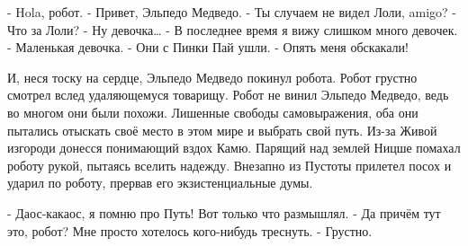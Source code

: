 - Hola, робот.
- Привет, Эльпедо Медведо.
- Ты случаем не видел Лоли, amigo?
- Что за Лоли?
- Ну девочка…
- В последнее время я вижу слишком много девочек.
- Маленькая девочка.
- Они с Пинки Пай ушли.
- Опять меня обскакали!

И, неся тоску на сердце, Эльпедо Медведо покинул робота. Робот грустно смотрел вслед удаляющемуся товарищу. Робот не винил Эльпедо Медведо, ведь во многом они были похожи. Лишенные свободы самовыражения, оба они пытались отыскать своё место в этом мире и выбрать свой путь. Из-за Живой изгороди донесся понимающий вздох Камю. Парящий над землей Ницше помахал роботу рукой, пытаясь вселить надежду. Внезапно из Пустоты прилетел посох и ударил по роботу, прервав его экзистенциальные думы.

- Даос-какаос, я помню про Путь! Вот только что размышлял.
- Да причём тут это, робот? Мне просто хотелось кого-нибудь треснуть.
- Грустно.